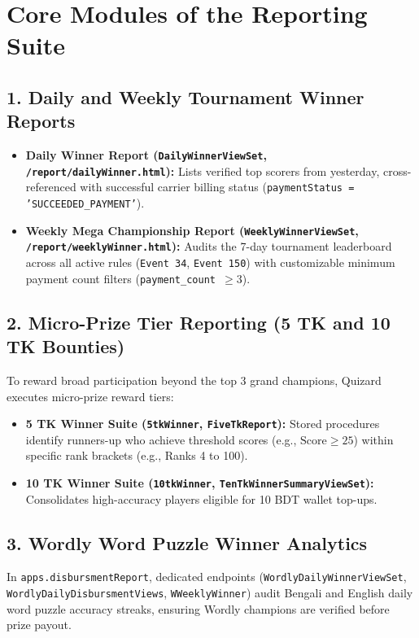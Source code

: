 \section{Core Modules of the Reporting Suite}

\subsection{1. Daily and Weekly Tournament Winner Reports}
\begin{itemize}
    \item \textbf{Daily Winner Report (\texttt{DailyWinnerViewSet}, \texttt{/report/dailyWinner.html}):} Lists verified top scorers from yesterday, cross-referenced with successful carrier billing status (\texttt{paymentStatus = 'SUCCEEDED\_PAYMENT'}).
    \item \textbf{Weekly Mega Championship Report (\texttt{WeeklyWinnerViewSet}, \texttt{/report/weeklyWinner.html}):} Audits the 7-day tournament leaderboard across all active rules (\texttt{Event 34}, \texttt{Event 150}) with customizable minimum payment count filters (\texttt{payment\_count $\ge 3$}).
\end{itemize}

\subsection{2. Micro-Prize Tier Reporting (5 TK and 10 TK Bounties)}
To reward broad participation beyond the top 3 grand champions, Quizard executes micro-prize reward tiers:
\begin{itemize}
    \item \textbf{5 TK Winner Suite (\texttt{5tkWinner}, \texttt{FiveTkReport}):} Stored procedures identify runners-up who achieve threshold scores (e.g., $\text{Score} \ge 25$) within specific rank brackets (e.g., Ranks 4 to 100).
    \item \textbf{10 TK Winner Suite (\texttt{10tkWinner}, \texttt{TenTkWinnerSummaryViewSet}):} Consolidates high-accuracy players eligible for 10 BDT wallet top-ups.
\end{itemize}

\subsection{3. Wordly Word Puzzle Winner Analytics}
In \texttt{apps.disbursmentReport}, dedicated endpoints (\texttt{WordlyDailyWinnerViewSet}, \texttt{WordlyDailyDisbursmentViews}, \texttt{WWeeklyWinner}) audit Bengali and English daily word puzzle accuracy streaks, ensuring Wordly champions are verified before prize payout.

